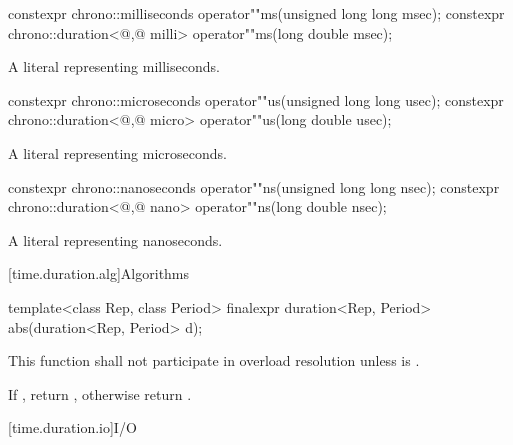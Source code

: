 %
\begin{itemdecl}
constexpr chrono::milliseconds                 operator""ms(unsigned long long msec);
constexpr chrono::duration<@\unspec,@ milli> operator""ms(long double msec);
\end{itemdecl}

\begin{itemdescr}
\pnum
\returns
A  literal representing  milliseconds.
\end{itemdescr}

%
\begin{itemdecl}
constexpr chrono::microseconds                 operator""us(unsigned long long usec);
constexpr chrono::duration<@\unspec,@ micro> operator""us(long double usec);
\end{itemdecl}

\begin{itemdescr}
\pnum
\returns
A  literal representing  microseconds.
\end{itemdescr}

%
\begin{itemdecl}
constexpr chrono::nanoseconds                 operator""ns(unsigned long long nsec);
constexpr chrono::duration<@\unspec,@ nano> operator""ns(long double nsec);
\end{itemdecl}

\begin{itemdescr}
\pnum
\returns
A  literal representing  nanoseconds.
\end{itemdescr}

[time.duration.alg]{Algorithms}

%
\begin{itemdecl}
template<class Rep, class Period>
  finalexpr duration<Rep, Period> abs(duration<Rep, Period> d);
\end{itemdecl}

\begin{itemdescr}
\pnum
\remarks This function shall not participate in overload resolution
unless  is .

\pnum
\returns If , return ,
otherwise return .
\end{itemdescr}

[time.duration.io]{I/O}

